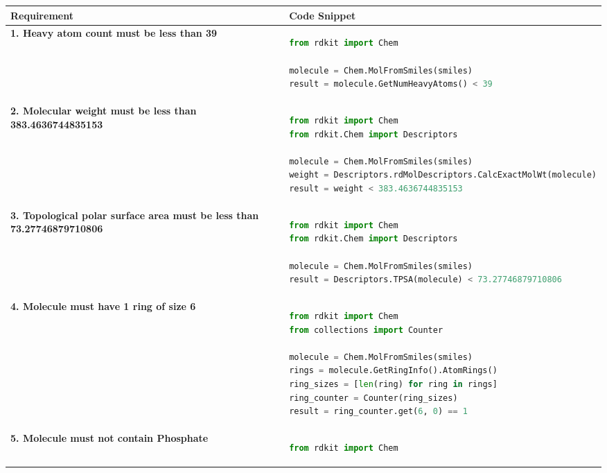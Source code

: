 \documentclass[10pt]{article} %
\begin{document}
    \begin{table}
        \small
        \centering
        \begin{tabular}{|p{}|p{}|}
            \hline
            \textbf{Requirement} & \textbf{Code Snippet} \\
            \hline

            \textbf{1. Heavy atom count must be less than 39} &
            \begin{lstlisting}[language=Python]
from rdkit import Chem

molecule = Chem.MolFromSmiles(smiles)
result = molecule.GetNumHeavyAtoms() < 39
            \end{lstlisting} \\
            \hline

            \textbf{2. Molecular weight must be less than 383.4636744835153} &
            \begin{lstlisting}[language=Python]
from rdkit import Chem
from rdkit.Chem import Descriptors

molecule = Chem.MolFromSmiles(smiles)
weight = Descriptors.rdMolDescriptors.CalcExactMolWt(molecule)
result = weight < 383.4636744835153
            \end{lstlisting} \\
            \hline

            \textbf{3. Topological polar surface area must be less than 73.27746879710806} &
            \begin{lstlisting}[language=Python]
from rdkit import Chem
from rdkit.Chem import Descriptors

molecule = Chem.MolFromSmiles(smiles)
result = Descriptors.TPSA(molecule) < 73.27746879710806
            \end{lstlisting} \\
            \hline

            \textbf{4. Molecule must have 1 ring of size 6} &
            \begin{lstlisting}[language=Python]
from rdkit import Chem
from collections import Counter

molecule = Chem.MolFromSmiles(smiles)
rings = molecule.GetRingInfo().AtomRings()
ring_sizes = [len(ring) for ring in rings]
ring_counter = Counter(ring_sizes)
result = ring_counter.get(6, 0) == 1
            \end{lstlisting} \\
            \hline

            \textbf{5. Molecule must not contain Phosphate} &
            \begin{lstlisting}[language=Python]
from rdkit import Chem


\end{lstlisting}
\end{tabular}
\end{table}
\end{document}
